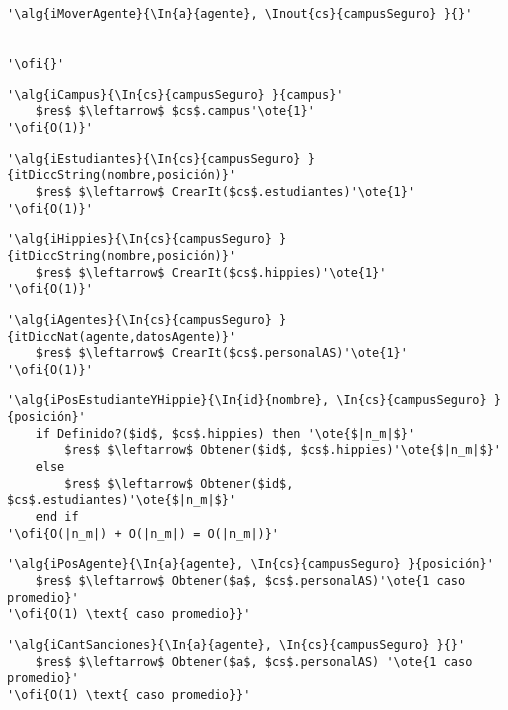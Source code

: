 \begin{lstlisting}[mathescape]
'\alg{iMoverAgente}{\In{a}{agente}, \Inout{cs}{campusSeguro} }{}'

	
'\ofi{}'
\end{lstlisting}

\begin{lstlisting}[mathescape]
'\alg{iCampus}{\In{cs}{campusSeguro} }{campus}'
	$res$ $\leftarrow$ $cs$.campus'\ote{1}'
'\ofi{O(1)}'
\end{lstlisting}

\begin{lstlisting}[mathescape]
'\alg{iEstudiantes}{\In{cs}{campusSeguro} }{itDiccString(nombre,posición)}'
	$res$ $\leftarrow$ CrearIt($cs$.estudiantes)'\ote{1}'
'\ofi{O(1)}'
\end{lstlisting}

\begin{lstlisting}[mathescape]
'\alg{iHippies}{\In{cs}{campusSeguro} }{itDiccString(nombre,posición)}'
	$res$ $\leftarrow$ CrearIt($cs$.hippies)'\ote{1}'
'\ofi{O(1)}'
\end{lstlisting}

\begin{lstlisting}[mathescape]
'\alg{iAgentes}{\In{cs}{campusSeguro} }{itDiccNat(agente,datosAgente)}'
	$res$ $\leftarrow$ CrearIt($cs$.personalAS)'\ote{1}'
'\ofi{O(1)}'
\end{lstlisting}

\begin{lstlisting}[mathescape]
'\alg{iPosEstudianteYHippie}{\In{id}{nombre}, \In{cs}{campusSeguro} }{posición}'
	if Definido?($id$, $cs$.hippies) then '\ote{$|n_m|$}'
		$res$ $\leftarrow$ Obtener($id$, $cs$.hippies)'\ote{$|n_m|$}'
	else
		$res$ $\leftarrow$ Obtener($id$, $cs$.estudiantes)'\ote{$|n_m|$}'
	end if
'\ofi{O(|n_m|) + O(|n_m|) = O(|n_m|)}'
\end{lstlisting}

\begin{lstlisting}[mathescape]
'\alg{iPosAgente}{\In{a}{agente}, \In{cs}{campusSeguro} }{posición}'
	$res$ $\leftarrow$ Obtener($a$, $cs$.personalAS)'\ote{1 caso promedio}'
'\ofi{O(1) \text{ caso promedio}}'
\end{lstlisting}

\begin{lstlisting}[mathescape]
'\alg{iCantSanciones}{\In{a}{agente}, \In{cs}{campusSeguro} }{}'
	$res$ $\leftarrow$ Obtener($a$, $cs$.personalAS) '\ote{1 caso promedio}'
'\ofi{O(1) \text{ caso promedio}}'
\end{lstlisting}

